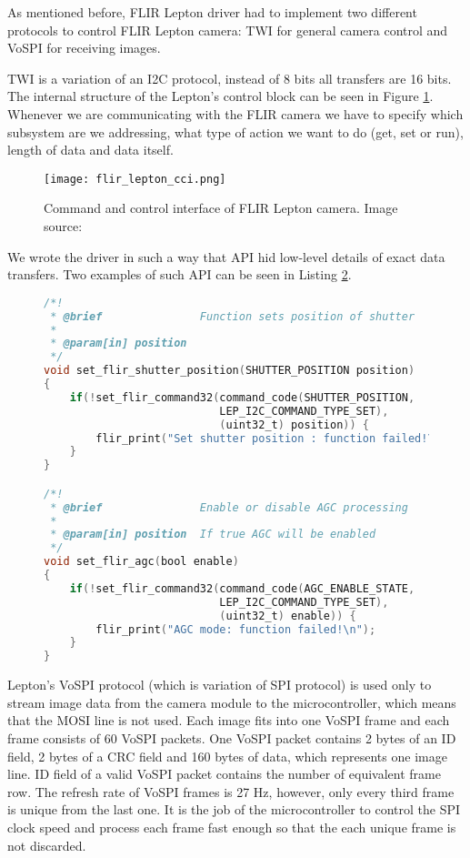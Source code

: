As mentioned before, FLIR Lepton driver had to implement two different protocols to control FLIR Lepton camera: TWI for general camera control and VoSPI for receiving images.

TWI is a variation of an I2C protocol, instead of 8 bits all transfers are 16 bits.
The internal structure of the Lepton's control block can be seen in Figure \ref{flir_lepton_cci}.
Whenever we are communicating with the FLIR camera we have to specify which subsystem are we addressing, what type of action we want to do (get, set or run), length of data and data itself.

\begin{figure}[ht]
        \centering
        \texttt{[image: flir\_lepton\_cci.png]} 
        \caption[Command and control interface of FLIR Lepton camera.]{Command and control interface of FLIR Lepton camera. Image source: \cite{flir_datasheet}} 
        \label{flir_lepton_cci}
\end{figure}

We wrote the driver in such a way that API hid low-level details of exact data transfers. 
Two examples of such API can be seen in Listing \ref{flir_api}.

\lstset{style=mystyle}
\begin{figure}[ht]
\begin{lstlisting}[language=C]
/*!
 * @brief               Function sets position of shutter
 *
 * @param[in] position  
 */
void set_flir_shutter_position(SHUTTER_POSITION position)
{ 
    if(!set_flir_command32(command_code(SHUTTER_POSITION, 
                           LEP_I2C_COMMAND_TYPE_SET), 
                           (uint32_t) position)) {
        flir_print("Set shutter position : function failed!\n");
    }
}

/*!
 * @brief               Enable or disable AGC processing
 *
 * @param[in] position  If true AGC will be enabled
 */
void set_flir_agc(bool enable)
{
    if(!set_flir_command32(command_code(AGC_ENABLE_STATE, 
                           LEP_I2C_COMMAND_TYPE_SET), 
                           (uint32_t) enable)) {
        flir_print("AGC mode: function failed!\n");
    }
}
\end{lstlisting}
\label{flir_api}
\end{figure}

Lepton's VoSPI protocol (which is variation of SPI protocol) is used only to stream image data from the camera module to the microcontroller, which means that the MOSI line is not used.
Each image fits into one VoSPI frame and each frame consists of 60 VoSPI packets.
One VoSPI packet contains 2 bytes of an ID field, 2 bytes of a CRC field and 160 bytes of data\footnotemark, which represents one image line.
ID field of a valid VoSPI packet contains the number of equivalent frame row.
The refresh rate of VoSPI frames is 27 \si{\hertz}, however, only every third frame is unique from the last one.
It is the job of the microcontroller to control the SPI clock speed and process each frame fast enough so that the each unique frame is not discarded.

